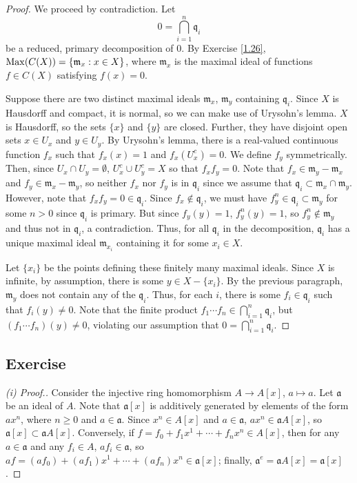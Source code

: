 \begin{proof}
We proceed by contradiction. Let
$$0 = \bigcap_{i=1}^n \mathfrak{q}_i$$
be a reduced, primary decomposition of $0$. By Exercise \ref{1.26}, $\operatorname{Max}(C(X)) = \{\mathfrak{m}_x : x \in X\}$, where $\mathfrak{m}_x$ is the maximal ideal of functions $f \in C(X)$
satisfying $f(x) = 0$. 

Suppose there are two distinct maximal ideals $\mathfrak{m}_x$, $\mathfrak{m}_y$ containing $\mathfrak{q}_i$. Since $X$ is Hausdorff and compact, it is normal, so we can make use 
of Urysohn's lemma. $X$ is Hausdorff, so the sets $\{x\}$ and $\{y\}$ are closed. Further, they have disjoint open sets $x \in U_x$ and $y \in U_y$. By Urysohn's lemma, there is a 
real-valued continuous function $f_x$ such that $f_x(x) = 1$ and $f_x(U_x^c) = 0$. We define $f_y$ symmetrically. Then, since $U_x \cap U_y = \emptyset$, $U_x^c \cup U_y^c = X$ so that 
$f_x f_y = 0$. Note that $f_x \in \mathfrak{m}_y - \mathfrak{m}_x$ and $f_y \in \mathfrak{m}_x - \mathfrak{m}_y$, so neither $f_x$ nor $f_y$ is in $\mathfrak{q}_i$ since we
assume that $\mathfrak{q}_i \subset \mathfrak{m}_x \cap \mathfrak{m}_y$. However, note that $f_x f_y = 0 \in \mathfrak{q}_i$. Since $f_x \not\in \mathfrak{q}_i$, we must have
$f_y^n \in \mathfrak{q}_i \subset \mathfrak{m}_y$ for some $n > 0$ since $\mathfrak{q}_i$ is primary. But since $f_y(y) = 1$, $f_y^n(y) = 1$, so $f_y^n \not\in \mathfrak{m}_y$ and thus not in 
$\mathfrak{q}_i$, a contradiction. Thus, for all $\mathfrak{q}_i$ in the decomposition, $\mathfrak{q}_i$ has a unique maximal ideal $\mathfrak{m}_{x_i}$ containing it for some $x_i \in X$.

Let $\{x_i\}$ be the points defining these finitely many maximal ideals. Since $X$ is infinite, by assumption, there is some $y \in X - \{x_i\}$. By the previous paragraph, $\mathfrak{m}_y$
does not contain any of the $\mathfrak{q}_i$. Thus, for each $i$, there is some $f_i \in \mathfrak{q}_i$ such that $f_i(y) \neq 0$. Note that the finite product $f_1 \cdots f_n \in \bigcap_{i=1}^n \mathfrak{q}_i$,
but $(f_1 \cdots f_n)(y) \neq 0$, violating our assumption that $0 = \bigcap_{i=1}^n \mathfrak{q}_i$.
\end{proof}

\subsection{Exercise}\label{4.7}

\begin{proof}[(i) Proof.]
Consider the injective ring homomorphism $A \to A[x]$, $a \mapsto a$. Let $\mathfrak{a}$ be an ideal of $A$. Note that $\mathfrak{a}[x]$ is additively generated by elements of the 
form $ax^n$, where $n \ge 0$ and $a \in \mathfrak{a}$. Since $x^n \in A[x]$ and $a \in \mathfrak{a}$, $ax^n \in \mathfrak{a} A[x]$, so $\mathfrak{a}[x] \subset \mathfrak{a}A[x]$. Conversely, if 
$f = f_0 + f_1 x^1 + \cdots + f_n x^n \in A[x]$, then for any $a \in \mathfrak{a}$ and any $f_i \in A$, $af_i \in \mathfrak{a}$, so $af = (af_0) + (af_1)x^1 + \cdots + (af_n)x^n \in \mathfrak{a}[x]$; 
finally, $\mathfrak{a}^e = \mathfrak{a}A[x] = \mathfrak{a}[x]$.
\end{proof}

